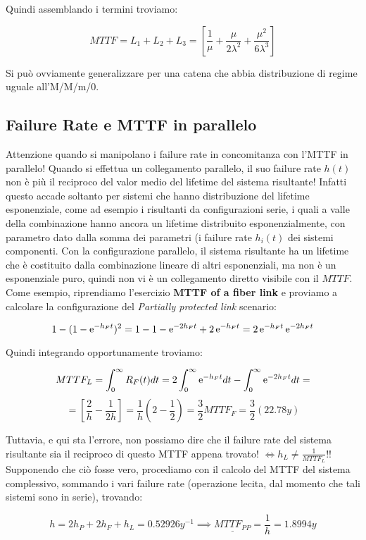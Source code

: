 Quindi assemblando i termini troviamo:

\[
	MTTF = L_1+L_2+L_3 = [\frac{1}{\mu}+\frac{\mu}{2\lambda^2}+\frac{\mu^2}{6\lambda^3}]
\]

Si può ovviamente generalizzare per una catena che abbia distribuzione di regime uguale all'M/M/m/0.

\subsection{Failure Rate e MTTF in parallelo}

Attenzione quando si manipolano i failure rate in concomitanza con l'MTTF in parallelo! Quando si effettua un collegamento parallelo, il suo failure rate $h(t)$ non è più il reciproco del valor medio del lifetime del sistema risultante! Infatti questo accade soltanto per sistemi che hanno distribuzione del lifetime esponenziale, come ad esempio i risultanti da configurazioni serie, i quali a valle della combinazione hanno ancora un lifetime distribuito esponenzialmente, con parametro dato dalla somma dei parametri (i failure rate $h_i(t)$ dei sistemi componenti. Con la configurazione parallelo, il sistema risultante ha un lifetime che è costituito dalla combinazione lineare di altri esponenziali, ma non è un esponenziale puro, quindi non vi è un collegamento diretto visibile con il $MTTF$. Come esempio, riprendiamo l'esercizio \textbf{MTTF of a fiber link} e proviamo a calcolare la configurazione del \textit{Partially protected link} scenario:

\[
	1-(1-\mathop{}\!\mathrm{e}^{-h_Ft})^2 = 1-1-\mathop{}\!\mathrm{e}^{-2h_Ft}+2\mathop{}\!\mathrm{e}^{-h_Ft} = 2\mathop{}\!\mathrm{e}^{-h_Ft}\mathop{}\!\mathrm{e}^{-2h_Ft}
\]

Quindi integrando opportunamente troviamo:

\[
	MTTF_L = \int_0^\infty{R_F(t)dt} = 2\int_0^\infty{\mathop{}\!\mathrm{e}^{-h_Ft}dt}-\int_0^\infty{\mathop{}\!\mathrm{e}^{-2h_Ft}dt} =
\]
\[
	= [\frac{2}{h}-\frac{1}{2h}] = \frac{1}{h}(2-\frac{1}{2}) = \frac{3}{2}MTTF_F = \frac{3}{2}(22.78y)
\]

Tuttavia, e qui sta l'errore, non possiamo dire che il failure rate del sistema risultante sia il reciproco di questo MTTF appena trovato! $\iff h_L\neq \frac{1}{MTTF_L}$!! Supponendo che ciò fosse vero, procediamo con il calcolo del MTTF del sistema complessivo, sommando i vari failure rate (operazione lecita, dal momento che tali sistemi sono in serie), trovando:

\[
	h = 2h_P+2h_F+h_L = 0.52926y^{-1} \implies\underline{MTTF_{PP}} = \frac{1}{h}=1.8994y
\]

